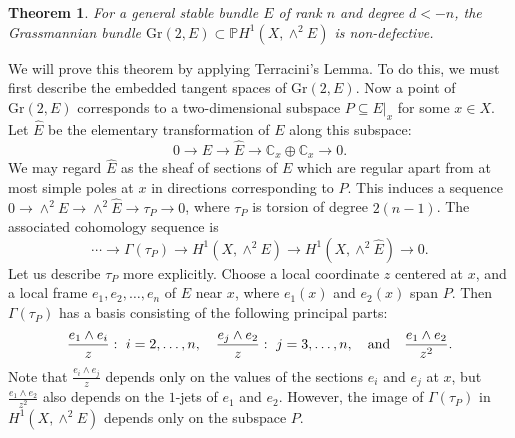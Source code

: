 \documentclass[10pt]{amsart}
\numberwithin{equation}{section}
\newcommand{\pp}{\mathbb P}
\newcommand{\cc}{\mathbb C}
\newcommand{\Gr}{\mathrm{Gr}}
\newtheorem{theorem}{{\textbf Theorem}}[section]
\begin{document}
\begin{theorem} \label{nondefectivity} For a general stable bundle $E$ of rank $n$ and degree $d < -n$, the Grassmannian bundle $\Gr(2, E) \subset \pp H^1 (X, \wedge^2 E)$ is non-defective.
\end{theorem}
We will prove this theorem by applying Terracini's Lemma. To do this, we must first describe the embedded tangent spaces of $\Gr(2, E)$. Now a point of $\Gr(2, E)$ corresponds to a two-dimensional subspace $P \subseteq E|_x$ for some $x \in X$. Let $\hat{E}$ be the elementary transformation of $E$ along this subspace:
\[
0 \to E \to \hat{E} \to \cc_x \oplus \cc_x \to 0.
\]
We may regard $\hat{E}$ as the sheaf of sections of $E$ which are regular apart from at most simple poles at $x$ in directions corresponding to $P$. This induces a sequence $0 \to \wedge^2 E \to \wedge^2 \hat{E} \to \tau_P \to 0$, where $\tau_P$ is torsion of degree $2(n-1)$. 
 The associated cohomology sequence is
\begin{equation}
\cdots \to \Gamma \left( \tau_P \right) \to H^1(X, \wedge^2 E) \longrightarrow H^1(X, \wedge^2 \hat{E})  \longrightarrow 0. \label{tauP}
\end{equation}
Let us describe $\tau_P$ more explicitly. Choose a local coordinate $z$ centered at $x$, and a local frame $e_1, e_2, \ldots , e_n$ of $E$ near $x$, where $e_1(x)$ and $e_2(x)$ span $P$. Then $\Gamma(\tau_P)$ has a basis consisting of the following principal parts:
\begin{equation} \frac{e_{1} \wedge e_i}{z} : \ i = 2, \ldots , n, \quad \frac{e_{j} \wedge e_2}{z}: \ j = 3, \ldots , n, \quad \hbox{and} \quad \frac{e_{1} \wedge e_2}{z^2}. \label{GammatauPbasis} \end{equation}
Note that $\frac{e_i \wedge e_j}{z}$ depends only on the values of the sections $e_i$ and $e_j$ at $x$, but $\frac{e_{1} \wedge e_2}{z^2}$ also depends on the $1$-jets of $e_1$ and $e_2$. However, the image of $\Gamma(\tau_P)$ in $H^1 (X, \wedge^2 E)$ depends only on the subspace $P$.
\end{document}
